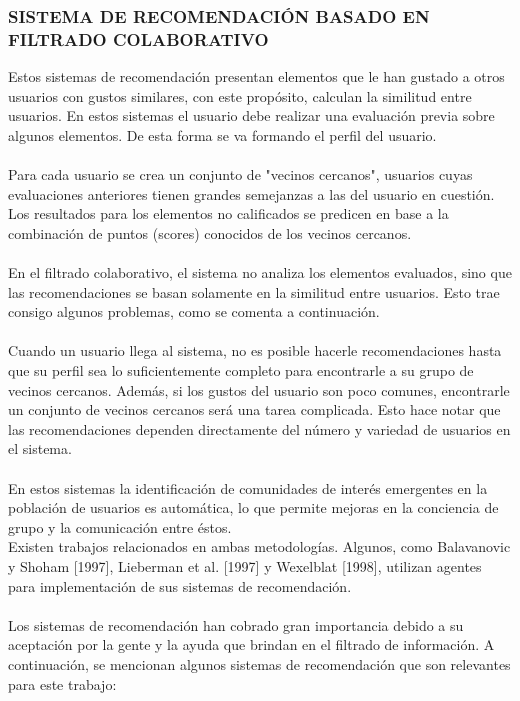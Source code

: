 \documentclass[11pt,a4paper]{article}
\begin{document}
		 \subsubsection{SISTEMA DE RECOMENDACIÓN BASADO EN FILTRADO COLABORATIVO 
		 } 
		 Estos sistemas de recomendación presentan elementos que le han gustado a otros usuarios con gustos similares, con este propósito, calculan la similitud entre usuarios. En estos sistemas el usuario debe realizar una evaluación previa sobre algunos elementos. De esta forma se va formando el perfil del usuario.\\
		 \\
		 Para cada usuario se crea un conjunto de "vecinos cercanos", usuarios cuyas evaluaciones anteriores tienen grandes semejanzas a las del usuario en cuestión. Los resultados para los elementos no calificados se predicen en base a la combinación de puntos (scores) conocidos de los vecinos cercanos.\\
		 \\
		 En el filtrado colaborativo, el sistema no analiza los elementos evaluados, sino que las recomendaciones se basan solamente en la similitud entre usuarios. Esto trae consigo algunos problemas, como se comenta a continuación.\\
		 \\
		 Cuando un usuario llega al sistema, no es posible hacerle recomendaciones hasta que su perfil sea lo suficientemente completo para encontrarle a su grupo de vecinos cercanos. Además, si los gustos del usuario son poco comunes, encontrarle un conjunto de vecinos cercanos será una tarea complicada. Esto hace notar que las recomendaciones dependen directamente del número y variedad de usuarios en el sistema.\\
		 \\
		 En estos sistemas la identificación de comunidades de interés emergentes en la población de usuarios es automática, lo que permite mejoras en la conciencia de grupo y la comunicación entre éstos.\cite{nro2:Online} %
		 \\
		 
		 Existen trabajos relacionados en ambas metodologías. Algunos, como Balavanovic y Shoham [1997], Lieberman et al. [1997] y Wexelblat [1998], utilizan agentes para implementación de sus sistemas de recomendación.\\
		 \\
		 Los sistemas de recomendación han cobrado gran importancia debido a su aceptación por la gente y la ayuda que brindan en el filtrado de información. A continuación, se mencionan algunos sistemas de recomendación que son relevantes para este trabajo:
		 
\end{document}
